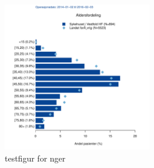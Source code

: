 \documentclass[norsk,a4paper]{article}\usepackage[]{graphicx}\usepackage[]{color}
\begin{document}
\begin{figure}[ht]
\centering
\includegraphics[width=0.58\textwidth]{test.pdf}
\caption{testfigur for nger}
\end{figure}
\end{document}
